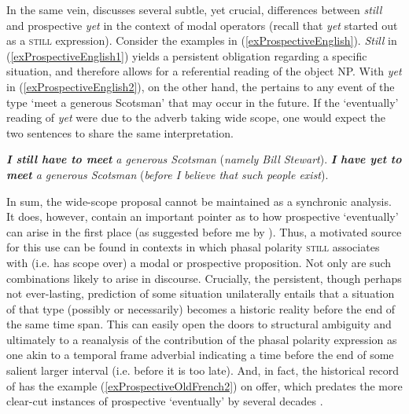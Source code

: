 In the same vein, \textcite[141–150]{Koenig1991} discusses several subtle, yet crucial, differences between  \textit{still} and prospective \textit{yet} in the context of modal operators (recall that \textit{yet} started out as a \textsc{still} expression). Consider the examples in (\ref{exProspectiveEnglish}). \textit{Still} in (\ref{exProspectiveEnglish1}) yields a persistent obligation regarding a specific situation, and therefore allows for a referential reading of the object NP. With \textit{yet} in (\ref{exProspectiveEnglish2}), on the other hand, the  pertains to any event of the type \lq meet a generous Scotsman\rq{ }that may occur in the future. If the \lq eventually\rq{ }reading of \textit{yet} were due to the adverb taking wide scope, one would expect the two sentences to share the same interpretation.

\begin{exe}
	\ex {}\label{exProspectiveEnglish}
	\begin{xlist}
		\ex \textit{\textbf{I still have to meet} a generous Scotsman} (\textit{namely Bill Stewart}).\label{exProspectiveEnglish1}
		\ex \textit{\textbf{I have yet to meet} a generous Scotsman} (\textit{before I believe that such people exist}).\label{exProspectiveEnglish2}
\parencite[149–150]{Koenig1991}
\end{xlist}
\end{exe}

In sum, the wide-scope proposal cannot be maintained as a synchronic analysis. It does, however, contain an important pointer as to how prospective \lq eventually\rq{ }can arise in the first place (as suggested before me by \cite{Abraham1977}). Thus, a motivated source for this use can be found in contexts in which phasal polarity \textsc{still} associates with (i.e. has scope over) a modal or prospective proposition. Not only are such combinations likely to arise in discourse. Crucially, the persistent, though perhaps not ever-lasting, prediction of some situation unilaterally entails that a situation of that type (possibly or necessarily) becomes a historic reality before the end of the same time span. This can easily open the doors to structural ambiguity and ultimately to a reanalysis of the contribution of the phasal polarity expression as one akin to a temporal frame adverbial indicating a time before the end of some salient larger interval (i.e. before it is too late). And, in fact, the historical record of  has the example (\ref{exProspectiveOldFrench2}) on offer, which predates the more clear-cut instances of prospective \lq eventually\rq{ }by several decades \parencite[146 fn 12]{MosegaardHansen2008}.

